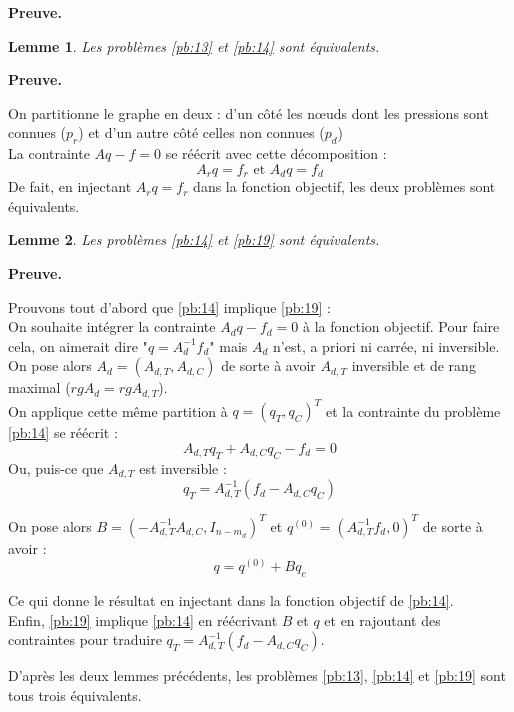 \documentclass{article}
\newenvironment{proof}
  {\par\noindent\normalfont\textbf{Preuve.}\par\nopagebreak%
  \begin{mdframed}[
     linewidth=1pt,
     linecolor=black,
     bottomline=false,topline=false,rightline=false,
     innerrightmargin=0pt,innertopmargin=0pt,innerbottommargin=0pt,
     innerleftmargin=1em,%
     skipabove=.5\baselineskip
   ]}
  {\end{mdframed}}
\newtheorem{lemma}{Lemme}
\begin{document}
    \begin{proof}
        
        \begin{lemma}
            Les problèmes \ref{pb:13} et \ref{pb:14} sont équivalents.    
        \end{lemma}
        \begin{proof}
            On partitionne le graphe en deux : d'un côté les n\oe uds dont les pressions sont connues ($p_r$) et d'un autre côté celles non connues ($p_d$)\\
            La contrainte $Aq - f = 0$ se réécrit avec cette décomposition : 
            \[ A_rq = f_r \text{ et } A_dq = f_d\]
            De fait, en injectant $A_rq = f_r$ dans la fonction objectif, les deux problèmes sont équivalents.        
        \end{proof}
        \begin{lemma}
            Les problèmes \ref{pb:14} et \ref{pb:19} sont équivalents.    
        \end{lemma}
        \begin{proof}
            Prouvons tout d'abord que \ref{pb:14} implique \ref{pb:19} :\\
            On souhaite intégrer la contrainte $A_dq - f_d = 0$ à la fonction objectif. Pour faire cela, on aimerait dire "$q = A_d^{-1}f_d$" mais $A_d$ n'est, a priori ni carrée, ni inversible.\\
            On pose alors $A_d = (A_{d, T}, A_{d, C})$ de sorte à avoir $A_{d, T}$ inversible et de rang maximal ($rg A_d = rg A_{d, T}$).\\
            On applique cette même partition à $q = (q_T, q_C)^T$ et la contrainte du problème \ref{pb:14} se réécrit :
            \[A_{d, T}q_T + A_{d, C}q_C - f_d = 0 \]
            Ou, puis-ce que $A_{d, T}$ est inversible :
            \[ \boxed{q_T = A_{d, T}^{-1}(f_d - A_{d, C}q_C)} \]

            On pose alors $B = (-A_{d, T}^{-1}A_{d,C}, I_{n - m_d})^T$ et $q^{(0)} = (A_{d, T}^{-1}f_d, 0)^T$ de sorte à avoir :
            \[ q = q^{(0)} + Bq_c \]

            Ce qui donne le résultat en injectant dans la fonction objectif de \ref{pb:14}.\\
            
            Enfin, \ref{pb:19} implique \ref{pb:14} en réécrivant $B$ et $q$ et en rajoutant des contraintes pour traduire $q_T = A_{d, T}^{-1}(f_d - A_{d, C}q_C)$.           
        \end{proof}

        D'après les deux lemmes précédents, les problèmes \ref{pb:13}, \ref{pb:14} et \ref{pb:19} sont tous trois équivalents.
    \end{proof}
\end{document}

